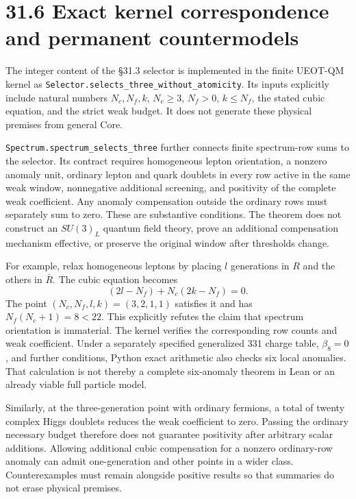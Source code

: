 \documentclass[
  11pt,
  oneside]{book}
\begin{document}
\section{31.6 Exact kernel correspondence and permanent countermodels}

The integer content of the §31.3 selector is implemented in the finite
UEOT-QM kernel as \texttt{Selector.\allowbreak selects\_\allowbreak three\_\allowbreak without\_\allowbreak atomicity}.
Its inputs explicitly include natural numbers \(N_c,N_f,k\),
\(N_c\ge3\), \(N_f>0\), \(k\le N_f\), the stated cubic equation, and the
strict weak budget. It does not generate these physical premises from
general Core.

\texttt{Spectrum.\allowbreak spectrum\_\allowbreak selects\_\allowbreak three} further connects finite
spectrum-row sums to the selector. Its contract requires homogeneous
lepton orientation, a nonzero anomaly unit, ordinary lepton and quark
doublets in every row active in the same weak window, nonnegative
additional screening, and positivity of the complete weak coefficient.
Any anomaly compensation outside the ordinary rows must separately sum
to zero. These are substantive conditions. The theorem does not
construct an \(SU(3)_L\) quantum field theory, prove an additional
compensation mechanism effective, or preserve the original window after
thresholds change.

For example, relax homogeneous leptons by placing \(l\) generations in
\(R\) and the others in \(\bar R\). The cubic equation becomes \[
(2l-N_f)+N_c(2k-N_f)=0.
\] The point \((N_c,N_f,l,k)=(3,2,1,1)\) satisfies it and has
\(N_f(N_c+1)=8<22\). This explicitly refutes the claim that spectrum
orientation is immaterial. The kernel verifies the corresponding row
counts and weak coefficient. Under a separately specified generalized
331 charge table, \(\beta_8=0\), and further conditions, Python exact
arithmetic also checks six local anomalies. That calculation is not
thereby a complete six-anomaly theorem in Lean or an already viable full
particle model.

Similarly, at the three-generation point with ordinary fermions, a total
of twenty complex Higgs doublets reduces the weak coefficient to zero.
Passing the ordinary necessary budget therefore does not guarantee
positivity after arbitrary scalar additions. Allowing additional cubic
compensation for a nonzero ordinary-row anomaly can admit one-generation
and other points in a wider class. Counterexamples must remain alongside
positive results so that summaries do not erase physical premises.
\end{document}
